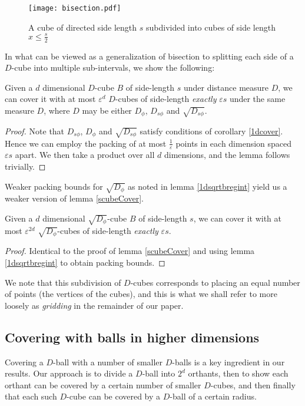 \documentclass[11pt]{myclass}
\newcommand{\breg}{\ensuremath{D_\phi}}
\newcommand{\sbreg}{\ensuremath{D_{s\phi}}}
\newcommand{\eps}{\varepsilon}
\begin{document}
\begin{figure}[H]
  \begin{center}
    \texttt{[image: bisection.pdf]}
  \end{center}
  \caption{A cube of directed side length $s$ subdivided into cubes of side length $x \leq \frac{s}{2}$ }
  \label{fig:bisection}
\end{figure}

 In what can be viewed as a generalization of bisection to splitting each side of a $D$-cube into multiple sub-intervals,
 we show the following:
 
\begin{lemma}\label{scubeCover}
Given a $d$ dimensional $D$-cube $B$ of side-length $s$ under distance measure $D$, 
we can cover it with at most $\eps^d$ $D$-cubes of side-length \emph{exactly} $\eps s$ under the same measure $D$, where $D$ may be either $\breg$, $\sbreg$ and $\sqrt{\sbreg}$. 
\end{lemma}

\begin{proof}
Note that $\sbreg$, $\breg$ and $\sqrt{\sbreg}$ satisfy conditions of corollary \ref{1dcover}. 
Hence we can employ the packing of at most $\frac{1}{\eps}$ points in each dimension spaced $\eps s$ apart. 
We then take a product over all $d$ dimensions, and the lemma follows trivially. 
\end{proof}
 
 Weaker packing bounds for $\sqrt{\breg}$ as noted in lemma \ref{1dsqrtbregint} yield us a weaker version of lemma \ref{scubeCover}.
\begin{lemma}\label{acubeCover}
Given a $d$ dimensional $\sqrt{\breg}$-cube $B$ of side-length $s$, 
we can cover it with at most $\eps^{2d}$ $\sqrt{\breg}$-cubes of side-length \emph{exactly} $\eps s$.
\end{lemma}
\begin{proof}
Identical to the proof of lemma \ref{scubeCover} and using lemma \ref{1dsqrtbregint} to obtain packing bounds.
\end{proof}
We note that this subdivision of $D$-cubes corresponds to placing an equal number of points (the vertices of the cubes),
and this is what we shall refer to more loosely as \emph{gridding} in the remainder of our paper.



\subsection{Covering with balls in higher dimensions}
Covering a $D$-ball with a number of smaller $D$-balls is a key ingredient in our results. Our approach is to divide a $D$-ball into $2^d$
orthants, then to show each orthant can be covered by a certain number of smaller $D$-cubes, and then finally that each
such $D$-cube
can be covered by a $D$-ball of a certain radius. 
\end{document}
